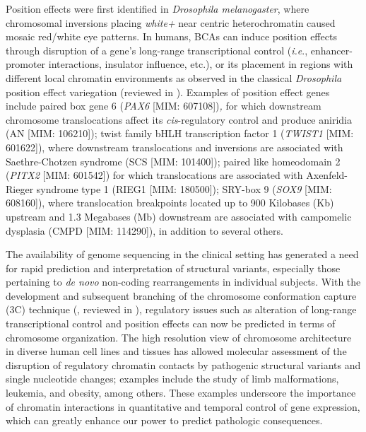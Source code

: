 \documentclass[a4paper,twoside=true,openright,parskip=full,chapterprefix=true,11pt,headings=normal,bibliography=totoc,listof=totoc,titlepage=on,captions=tableabove,draft=false]{scrreprt}
\theoremstyle{definition}
\theoremstyle{definition}
\theoremstyle{definition}
\theoremstyle{remark}
\begin{document}
Position effects were first identified in \emph{Drosophila
melanogaster}, where chromosomal inversions placing \emph{white+} near
centric heterochromatin caused mosaic red/white eye
patterns.\citep{Weiler1995} In humans, BCAs can induce position effects
through disruption of a gene's long-range transcriptional control
(\emph{i.e}., enhancer-promoter interactions, insulator influence,
etc.), or its placement in regions with different local chromatin
environments as observed in the classical \emph{Drosophila} position
effect variegation (reviewed in
\citep{Kleinjan2005, Zhang2015, Spielmann2016}). Examples of position
effect genes include paired box gene 6 (\emph{PAX6} {[}MIM:
607108{]})\emph{,} for which downstream chromosome translocations affect
its \emph{cis}-regulatory control and produce aniridia (AN {[}MIM:
106210{]});\citep{Fantes1995, Kleinjan2001} twist family bHLH
transcription factor 1 (\emph{TWIST1} {[}MIM: 601622{]}), where
downstream translocations and inversions are associated with
Saethre-Chotzen syndrome (SCS {[}MIM: 101400{]});\citep{Cai2003} paired
like homeodomain 2 (\emph{PITX2} {[}MIM: 601542{]}) for which
translocations are associated with Axenfeld-Rieger syndrome type 1
(RIEG1 {[}MIM: 180500{]});\citep{Flomen1998, Trembath2004} SRY-box 9
(\emph{SOX9} {[}MIM: 608160{]}), where translocation breakpoints located
up to 900 Kilobases (Kb) upstream and 1.3 Megabases (Mb) downstream are
associated with campomelic dysplasia (CMPD {[}MIM:
114290{]}),\citep{Velagaleti2005} in addition to several
others.\citep{Kleinjan2005, Kleinjan1998, Lupski2005}

The availability of genome sequencing in the clinical setting has
generated a need for rapid prediction and interpretation of structural
variants, especially those pertaining to \emph{de novo} non-coding
rearrangements in individual subjects. With the development and
subsequent branching of the chromosome conformation capture (3C)
technique (\citep{Dekker2002}, reviewed in \citep{DeWit2012}),
regulatory issues such as alteration of long-range transcriptional
control and position effects can now be predicted in terms of chromosome
organization. The high resolution view of chromosome architecture in
diverse human cell lines and
tissues\citep{Lieberman-Aiden2009, Fullwood2009, Dixon2012, Sanyal2012, Phillips-Cremins2013, Rao2014, Mifsud2015}
has allowed molecular assessment of the disruption of regulatory
chromatin contacts by pathogenic structural variants and single
nucleotide changes; examples include the study of limb
malformations,\citep{Lupianez2015} leukemia,\citep{Groschel2014} and
obesity,\citep{Claussnitzer2015} among
others.\citep{Visser2012, Roussos2014, Giorgio2015, Oldridge2015, Ibn-Salem2014}
These examples underscore the importance of chromatin interactions in
quantitative and temporal control of gene expression, which can greatly
enhance our power to predict pathologic consequences.
\end{document}
